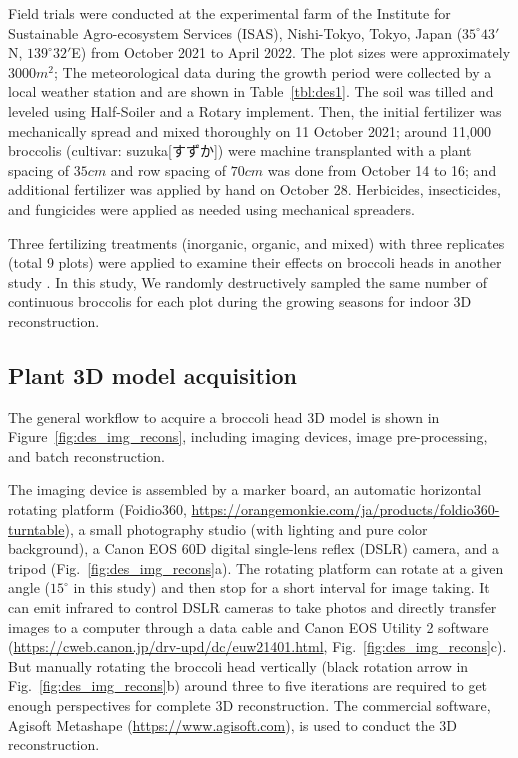 Field trials were conducted at the experimental farm of the Institute for Sustainable Agro-ecosystem Services (ISAS), Nishi-Tokyo, Tokyo, Japan ($35^\circ 43'$N, $139^\circ 32'$E) from October 2021 to April 2022. The plot sizes were approximately $3000 m^2$; The meteorological data during the growth period were collected by a local weather station and are shown in Table~\ref{tbl:des1}. The soil was tilled and leveled using Half-Soiler and a Rotary implement. Then, the initial fertilizer was mechanically spread and mixed thoroughly on 11 October 2021; around 11,000 broccolis (cultivar: suzuka[すずか]) were machine transplanted with a plant spacing of $35 cm$ and row spacing of $70 cm$ was done from October 14 to 16; and additional fertilizer was applied by hand on October 28. Herbicides, insecticides, and fungicides were applied as needed using mechanical spreaders.



Three fertilizing treatments (inorganic, organic, and mixed) with three replicates (total 9 plots) were applied to examine their effects on broccoli heads in another study \citep{nishida_estimation_2023}. In this study, We randomly destructively sampled the same number of continuous broccolis for each plot during the growing seasons for indoor 3D reconstruction. 

\subsection{Plant 3D model acquisition}

The general workflow to acquire a broccoli head 3D model is shown in Figure~\ref{fig:des_img_recons}, including imaging devices, image pre-processing, and batch reconstruction.



The imaging device is assembled by a marker board, an automatic horizontal rotating platform (Foidio360, \url{https://orangemonkie.com/ja/products/foldio360-turntable}), a small photography studio (with lighting and pure color background), a Canon EOS 60D digital single-lens reflex (DSLR) camera, and a tripod (Fig.~\ref{fig:des_img_recons}a). The rotating platform can rotate at a given angle ($15^\circ$ in this study) and then stop for a short interval for image taking. It can emit infrared to control DSLR cameras to take photos and directly transfer images to a computer through a data cable and Canon EOS Utility 2 software (\url{https://cweb.canon.jp/drv-upd/dc/euw21401.html}, Fig.~\ref{fig:des_img_recons}c). But manually rotating the broccoli head vertically (black rotation arrow in Fig.~\ref{fig:des_img_recons}b) around three to five iterations are required to get enough perspectives for complete 3D reconstruction. The commercial software, Agisoft Metashape (\url{https://www.agisoft.com}), is used to conduct the 3D reconstruction.

